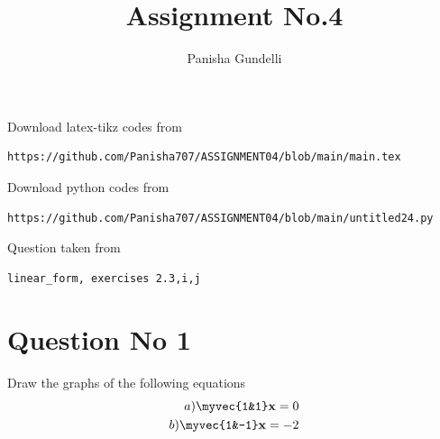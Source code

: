 \documentclass[journal,12pt,twocolumn]{IEEEtran}
\begin{document}
\makeatother
\let\StandardTheFigure\thefigure
\let\vec\mathbf
\renewcommand{\thefigure}{\theproblem}
\def\putbox#1#2#3{\makebox[0in][l]{\makebox[#1][l]{}\raisebox{\baselineskip}[0in][0in]{\raisebox{#2}[0in][0in]{#3}}}}
     \def\rightbox#1{\makebox[0in][r]{#1}}
     \def\centbox#1{\makebox[0in]{#1}}
     \def\topbox#1{\raisebox{-\baselineskip}[0in][0in]{#1}}
     \def\midbox#1{\raisebox{-0.5\baselineskip}[0in][0in]{#1}}
\vspace{3cm}
\title{Assignment No.4}
\author{Panisha Gundelli}
\maketitle
\newpage
\bigskip
\renewcommand{\thefigure}{\theenumi}
\renewcommand{\thetable}{\theenumi}
Download latex-tikz codes from
\begin{lstlisting}
https://github.com/Panisha707/ASSIGNMENT04/blob/main/main.tex
\end{lstlisting}
%
Download python codes from
\begin{lstlisting}
https://github.com/Panisha707/ASSIGNMENT04/blob/main/untitled24.py
\end{lstlisting}
%
Question taken from
\begin{lstlisting}
linear_form, exercises 2.3,i,j
\end{lstlisting}
\section{Question No 1}
Draw the graphs of the following equations
\begin{align}
  a) \myvec{1&1}\vec{x}=0\\
  b) \myvec{1&-1}\vec{x}=-2
\end{align}
\end{document}
